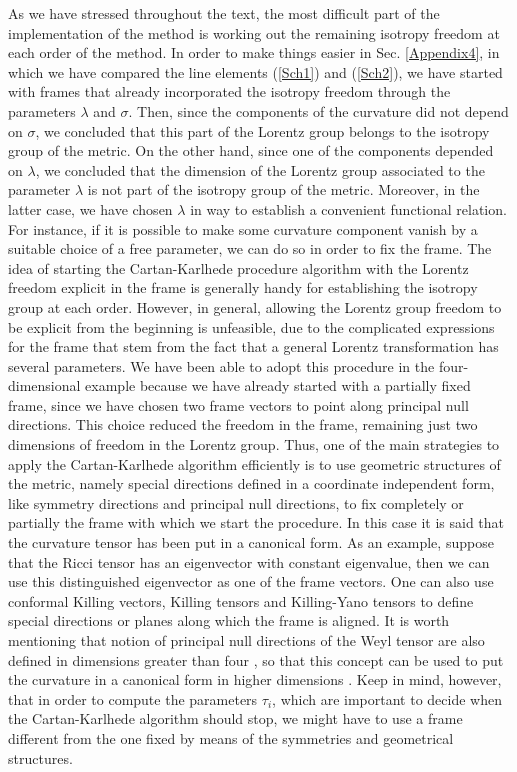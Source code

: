 \documentclass[twocolumn,prd,aps,showpacs,showkeys,amsmath,amssymb]{revtex4-1}
\begin{document}
As we have stressed throughout the text, the most difficult part of the implementation of the method is working out the remaining isotropy freedom at each order of the method. In order to make things easier in Sec. \ref{Appendix4}, in which we have compared the line elements (\ref{Sch1}) and (\ref{Sch2}), we have started with frames that already incorporated the isotropy freedom through the parameters $\lambda$ and $\sigma$. Then, since the components of the curvature did not depend on $\sigma$, we concluded that this part of the Lorentz group belongs to the isotropy group of the metric. On the other hand, since one of the components depended on $\lambda$, we concluded that the dimension of the Lorentz group associated to the parameter $\lambda$ is not part of the isotropy group of the metric. Moreover, in the latter case, we have chosen $\lambda$ in way to establish a convenient functional relation. For instance, if it is possible to make some curvature component vanish by a suitable choice of a free parameter, we can do so in order to fix the frame. The idea of starting the Cartan-Karlhede procedure algorithm with the Lorentz freedom explicit in the frame is generally handy for establishing the isotropy group at each order. However, in general, allowing the Lorentz group freedom to be explicit from the beginning is unfeasible, due to the complicated expressions for the frame that stem from the fact that a general Lorentz transformation has several parameters. We have been able to adopt this procedure in the four-dimensional example because we have already started with a partially fixed frame, since we have chosen two frame vectors to point along principal null directions. This choice reduced the freedom in the frame, remaining just two dimensions of freedom in the Lorentz group. Thus, one of the main strategies to apply the Cartan-Karlhede algorithm efficiently is to use geometric structures of the metric, namely special directions defined in a coordinate independent form, like symmetry directions and principal null directions, to fix completely or partially the frame with which we start the procedure. In this case it is said that the curvature tensor has been put in a canonical form. As an example, suppose that the Ricci tensor has an eigenvector with constant eigenvalue, then we can use this distinguished eigenvector as one of the frame vectors. One can also use conformal Killing vectors, Killing tensors and Killing-Yano tensors to define special directions or planes along which the frame is aligned. It is worth mentioning that notion of principal null directions of the Weyl tensor are also defined in dimensions greater than four \cite{CMPP,Rev. Coley}, so that this concept can be used to put the curvature in a canonical form in higher dimensions \cite{McNutt}. Keep in mind, however, that in order to compute the parameters $\tau_i$, which are important to decide when the Cartan-Karlhede algorithm should stop, we might have to use a frame different from the one fixed by means of the symmetries and geometrical structures.
\end{document}

